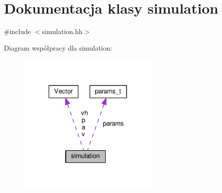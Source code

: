 \hypertarget{classsimulation}{\section{Dokumentacja klasy simulation}
\label{classsimulation}
}


{\ttfamily \#include $<$simulation.\-hh$>$}



Diagram współpracy dla simulation\-:\nopagebreak
\begin{figure}[H]
\begin{center}
\leavevmode
\includegraphics[width=199pt]{classsimulation__coll__graph}
\end{center}
\end{figure}
